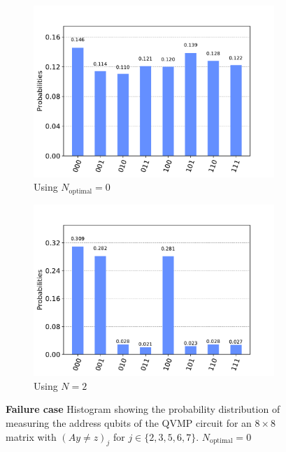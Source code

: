 \documentclass[11pt]{article}
\theoremstyle{definition}
\theoremstyle{remark}
\begin{document}
\begin{figure}[h!]
  \centering
  \begin{subfigure}{0.48\textwidth}
    \includegraphics[width=\textwidth]{../results/figures/qvmp_functionality_pfound_known__2.pdf}
    \caption{Using $N_{\text{optimal}} = 0$}
  \end{subfigure}
  \begin{subfigure}{0.48\textwidth}
    \includegraphics[width=\textwidth]{../results/figures/qvmp_functionality_pfound_unknown__2.pdf}
    \caption{Using $N = 2$}
  \end{subfigure}
  \caption{\textbf{Failure case} Histogram showing the probability distribution
  of measuring the address qubits of the QVMP circuit for an $8 \times 8$ matrix
  with $(Ay \neq z)_j$ for $j \in \{2, 3, 5, 6, 7\}$. $N_{\text{optimal}} = 0$}
  \label{fig:qvmp_functionality_pfound_unknown__2}
\end{figure}
\end{document}
